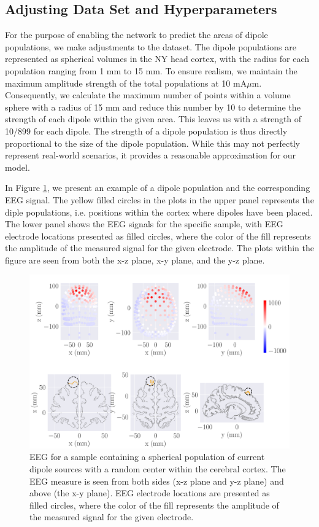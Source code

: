 \documentclass[a4paper, UKenglish, 11pt]{uiomaster}
\begin{document}
\subsection{Adjusting Data Set and Hyperparameters}
For the purpose of enabling the network to predict the areas of dipole populations, we make adjustments to the dataset. The dipole populations are represented as spherical volumes in the NY head cortex, with the radius for each population ranging from 1 mm to 15 mm. To ensure realism, we maintain the maximum amplitude strength of the total populations at 10 mA$\mu$m. Consequently, we calculate the maximum number of points within a volume sphere with a radius of 15 mm and reduce this number by 10 to determine the strength of each dipole within the given area. This leaves us with a strength of 10/899 for each dipole. The strength of a dipole population is thus directly proportional to the size of the dipole population. While this may not perfectly represent real-world scenarios, it provides a reasonable approximation for our model.

In Figure \ref{fig:dipole_area}, we present an example of a dipole population and the corresponding EEG signal. The yellow filled circles in the plots in the upper panel represents the diple populations, i.e. positions within the cortex where dipoles have been placed. The lower panel shows the EEG signals for the specific sample, with EEG electrode locations presented as filled circles, where the color of the fill represents the amplitude of the measured signal for the given electrode. The plots within the figure are seen from both the x-z plane, x-y plane, and the y-z plane.

\begin{figure}[!htb]
\centering
\includegraphics[width=\linewidth]{figures/dipole_area_reduced_0.pdf}
\caption{EEG for a sample containing a spherical population of current dipole sources with a random center within the cerebral cortex. The EEG measure is seen from both sides (x-z plane and y-z plane) and above (the x-y plane). EEG electrode locations are presented as filled circles, where the color of the fill represents the amplitude of the measured signal for the given electrode.}
\label{fig:dipole_area}
\end{figure}
\end{document}
